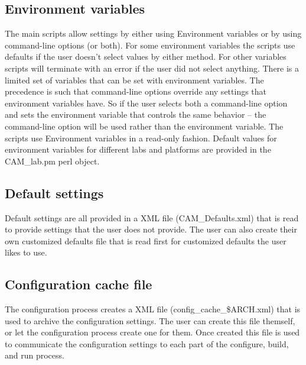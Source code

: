 \documentclass[]{article}
\begin{document}
\subsection{Environment variables}
The main scripts allow settings by either using Environment variables
or by using command-line options (or both). For some environment variables
the scripts use defaults if the user doesn't select values by either
method. For other variables scripts will terminate with an error if the user did not
select anything. There is a limited set of variables that can be set with environment
variables. The precedence is such that command-line options override 
any settings that environment variables have. So if the user selects
both a command-line option and sets the environment variable that controls
the same behavior -- the command-line option will be used rather than
the environment variable. The scripts use Environment variables in a read-only fashion.
Default values for environment variables for different labs and platforms are
provided in the CAM\_lab.pm perl object.

\subsection{Default settings}
Default settings are all provided in a XML file (CAM\_Defaults.xml) that is read to provide
settings that the user does not provide. The user can also create their own customized
defaults file that is read first for customized defaults the user likes to use.

\subsection{Configuration cache file}
The configuration process creates a XML file (config\_cache\_\$ARCH.xml) that is used
to archive the configuration settings. The user can create this file themself, or let
the configuration process create one for them. Once created this file is used to
communicate the configuration settings to each part of the configure, build, and run
process.
\end{document}
